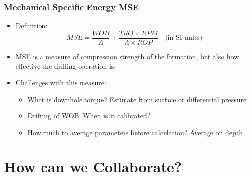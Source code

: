 \documentclass{beamer}
\begin{document}
\begin{frame} \frametitle{Mechanical Specific Energy MSE} 
\vspace{-1cm}

\begin{itemize}
\item<1-> Definition:
\begin{equation*}
MSE = \frac{WOB}{A} + \frac{TRQ \times RPM}{A \times ROP} \quad \mbox{(in SI units)}
\end{equation*}
\item<1-> MSE is a measure of compression strength of the formation, but also how effective the drilling operation is.

\item<2-> Challenges with this measure:
\begin{itemize}
\item<2-> What is downhole torque? Estimate from surface or differential pressure
\item<2-> Drifting of WOB. When is it calibrated?
\item<2-> How much to average parameters before calculation? Average on depth
\end{itemize}

\end{itemize}

\end{frame}




\section{How can we Collaborate?}
\end{document}

